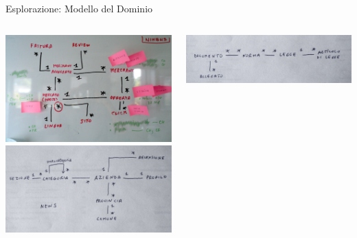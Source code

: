 \documentclass[compress, red, 14pt, pdf]{beamer}
\begin{document}
	\begin{frame}{Esplorazione: Modello del Dominio}
		\begin{columns}[T]
		    \begin{column}{.5\textwidth}
				\includegraphics[scale=0.12]{images/domain-2}
				\\ \vspace*{0.4cm}
				\includegraphics[scale=0.15]{images/domain-4}
		    \end{column}
		    \begin{column}{.5\textwidth}
				\vspace*{0.3cm}
				\hspace*{-0.3cm} \includegraphics[scale=0.15]{images/domain-5}

\end{column}
\end{columns}
\end{frame}
\end{document}
